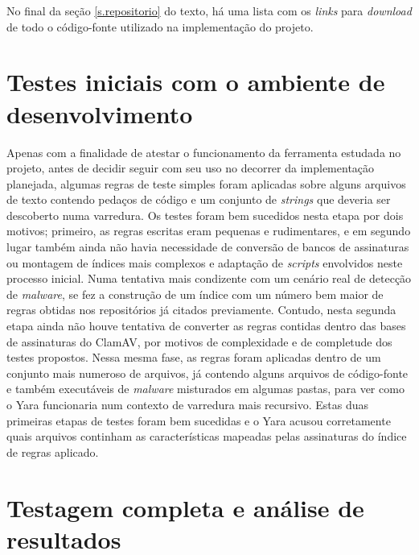 No final da seção \ref{s.repositorio} do texto, há uma lista com os \textit{links} para
\textit{download} de todo o código-fonte utilizado na implementação do projeto.

\section{Testes iniciais com o ambiente de desenvolvimento}
\label{s.testesiniciais}

Apenas com a finalidade de atestar o funcionamento da ferramenta estudada no
projeto, antes de decidir seguir com seu uso no decorrer da implementação
planejada, algumas regras de teste simples foram aplicadas sobre alguns arquivos
de texto contendo pedaços de código e um conjunto de \textit{strings} que
deveria ser descoberto numa varredura. Os testes foram bem sucedidos nesta etapa
por dois motivos; primeiro, as regras escritas eram pequenas e rudimentares, e
em segundo lugar também ainda não havia necessidade de conversão de bancos de
assinaturas ou montagem de índices mais complexos e adaptação de
\textit{scripts} envolvidos neste processo inicial. Numa tentativa mais
condizente com um cenário real de detecção de \textit{malware}, se fez a
construção de um índice com um número bem maior de regras obtidas nos
repositórios já citados previamente. Contudo, nesta segunda etapa ainda não
houve tentativa de converter as regras contidas dentro das bases de assinaturas do
ClamAV, por motivos de complexidade e de completude dos testes propostos. Nessa
mesma fase, as regras foram aplicadas dentro de um conjunto mais numeroso de
arquivos, já contendo alguns arquivos de código-fonte e também executáveis de
\textit{malware} misturados em algumas pastas, para ver como o Yara funcionaria
num contexto de varredura mais recursivo. Estas duas primeiras etapas de testes
foram bem sucedidas e o Yara acusou corretamente quais arquivos continham as
características mapeadas pelas assinaturas do índice de regras aplicado.



\section{Testagem completa e análise de resultados}
\label{s.testefull}

